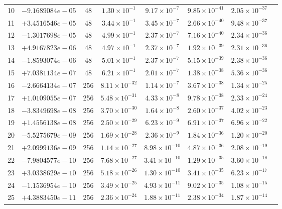 \documentclass[11pt]{article}
\begin{document}
\begin{longtable}{rlcccccc}
10 & $-9.1689084e-05$ & 48 & $1.30 \times 10^{-1}$ & $9.17 \times 10^{-7}$ & $9.85 \times 10^{-41}$ & $2.05 \times 10^{-37}$ \\
11 & $+3.4516546e-05$ & 48 & $3.44 \times 10^{-1}$ & $3.45 \times 10^{-7}$ & $2.66 \times 10^{-40}$ & $9.48 \times 10^{-37}$ \\
12 & $-1.3017698e-05$ & 48 & $4.99 \times 10^{-1}$ & $2.37 \times 10^{-7}$ & $7.16 \times 10^{-40}$ & $2.34 \times 10^{-36}$ \\
13 & $+4.9167823e-06$ & 48 & $4.97 \times 10^{-1}$ & $2.37 \times 10^{-7}$ & $1.92 \times 10^{-39}$ & $2.31 \times 10^{-36}$ \\
14 & $-1.8593074e-06$ & 48 & $5.01 \times 10^{-1}$ & $2.37 \times 10^{-7}$ & $5.15 \times 10^{-39}$ & $2.38 \times 10^{-36}$ \\
15 & $+7.0381134e-07$ & 48 & $6.21 \times 10^{-1}$ & $2.01 \times 10^{-7}$ & $1.38 \times 10^{-38}$ & $5.36 \times 10^{-36}$ \\
\midrule
16 & $-2.6664134e-07$ & 256 & $8.11 \times 10^{-32}$ & $1.14 \times 10^{-7}$ & $3.67 \times 10^{-38}$ & $1.34 \times 10^{-25}$ \\
17 & $+1.0109055e-07$ & 256 & $5.48 \times 10^{-31}$ & $4.33 \times 10^{-8}$ & $9.78 \times 10^{-38}$ & $2.33 \times 10^{-24}$ \\
18 & $-3.8349698e-08$ & 256 & $3.70 \times 10^{-30}$ & $1.64 \times 10^{-8}$ & $2.60 \times 10^{-37}$ & $4.02 \times 10^{-23}$ \\
19 & $+1.4556138e-08$ & 256 & $2.50 \times 10^{-29}$ & $6.23 \times 10^{-9}$ & $6.91 \times 10^{-37}$ & $6.96 \times 10^{-22}$ \\
20 & $-5.5275679e-09$ & 256 & $1.69 \times 10^{-28}$ & $2.36 \times 10^{-9}$ & $1.84 \times 10^{-36}$ & $1.20 \times 10^{-20}$ \\
21 & $+2.0999136e-09$ & 256 & $1.14 \times 10^{-27}$ & $8.98 \times 10^{-10}$ & $4.87 \times 10^{-36}$ & $2.08 \times 10^{-19}$ \\
22 & $-7.9804577e-10$ & 256 & $7.68 \times 10^{-27}$ & $3.41 \times 10^{-10}$ & $1.29 \times 10^{-35}$ & $3.60 \times 10^{-18}$ \\
23 & $+3.0338629e-10$ & 256 & $5.18 \times 10^{-26}$ & $1.30 \times 10^{-10}$ & $3.41 \times 10^{-35}$ & $6.23 \times 10^{-17}$ \\
24 & $-1.1536954e-10$ & 256 & $3.49 \times 10^{-25}$ & $4.93 \times 10^{-11}$ & $9.02 \times 10^{-35}$ & $1.08 \times 10^{-15}$ \\
25 & $+4.3883450e-11$ & 256 & $2.36 \times 10^{-24}$ & $1.88 \times 10^{-11}$ & $2.38 \times 10^{-34}$ & $1.87 \times 10^{-14}$ \\

\end{longtable}
\end{document}

